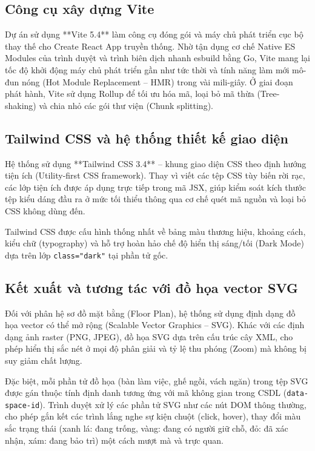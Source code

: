 \subsection{Công cụ xây dựng Vite}
Dự án sử dụng **Vite 5.4** \cite{vite_docs} làm công cụ đóng gói và máy chủ phát triển cục bộ thay thế cho Create React App truyền thống. Nhờ tận dụng cơ chế Native ES Modules của trình duyệt và trình biên dịch nhanh esbuild bằng Go, Vite mang lại tốc độ khởi động máy chủ phát triển gần như tức thời và tính năng làm mới mô-đun nóng (Hot Module Replacement -- HMR) trong vài mili-giây. Ở giai đoạn phát hành, Vite sử dụng Rollup để tối ưu hóa mã, loại bỏ mã thừa (Tree-shaking) và chia nhỏ các gói thư viện (Chunk splitting).

\subsection{Tailwind CSS và hệ thống thiết kế giao diện}
Hệ thống sử dụng **Tailwind CSS 3.4** \cite{tailwind_docs} -- khung giao diện CSS theo định hướng tiện ích (Utility-first CSS framework). Thay vì viết các tệp CSS tùy biến rời rạc, các lớp tiện ích được áp dụng trực tiếp trong mã JSX, giúp kiểm soát kích thước tệp kiểu dáng đầu ra ở mức tối thiểu thông qua cơ chế quét mã nguồn và loại bỏ CSS không dùng đến.

Tailwind CSS được cấu hình thống nhất về bảng màu thương hiệu, khoảng cách, kiểu chữ (typography) và hỗ trợ hoàn hảo chế độ hiển thị sáng/tối (Dark Mode) dựa trên lớp \texttt{class="dark"} tại phần tử gốc.

\subsection{Kết xuất và tương tác với đồ họa vector SVG}
Đối với phân hệ sơ đồ mặt bằng (Floor Plan), hệ thống sử dụng định dạng đồ họa vector có thể mở rộng (Scalable Vector Graphics -- SVG). Khác với các định dạng ảnh raster (PNG, JPEG), đồ họa SVG dựa trên cấu trúc cây XML, cho phép hiển thị sắc nét ở mọi độ phân giải và tỷ lệ thu phóng (Zoom) mà không bị suy giảm chất lượng.

Đặc biệt, mỗi phần tử đồ họa (bàn làm việc, ghế ngồi, vách ngăn) trong tệp SVG được gán thuộc tính định danh tương ứng với mã không gian trong CSDL (\texttt{data-space-id}). Trình duyệt xử lý các phần tử SVG như các nút DOM thông thường, cho phép gắn kết các trình lắng nghe sự kiện chuột (click, hover), thay đổi màu sắc trạng thái (xanh lá: đang trống, vàng: đang có người giữ chỗ, đỏ: đã xác nhận, xám: đang bảo trì) một cách mượt mà và trực quan.

